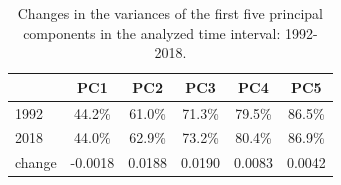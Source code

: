 \begin{table}[!htb]
	\centering
	\small
	\begin{tabular}{ lccccc }
		\toprule
		\text{} & PC1     & PC2    & PC3    & PC4    & PC5    \\
		\midrule
		1992    & 44.2\%  & 61.0\% & 71.3\% & 79.5\% & 86.5\% \\
		2018    & 44.0\%  & 62.9\% & 73.2\% & 80.4\% & 86.9\% \\
		\midrule
		change  & -0.0018 & 0.0188 & 0.0190 & 0.0083 & 0.0042 \\
		\bottomrule
	\end{tabular}
	\caption{Changes in the variances of the first five principal components in the analyzed time interval: 1992-2018.}
	\label{table:3}
\end{table}

